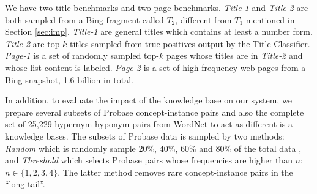 We have two title benchmarks and two page benchmarks.
\emph{Title-1} and \emph{Title-2} are both sampled from a
Bing fragment called $T_2$, different from $T_1$ mentioned in
Section \ref{sec:imp}. {\em Title-1} are general titles which contains
at least a number form.
{\em Title-2} are top-$k$ titles sampled from true positives output by the
Title Classifier.
\emph{Page-1} is a set of randomly sampled top-$k$ pages whose titles are in
{\em Title-2} and whose list content is labeled.
\emph{Page-2} is
a set of high-frequency web pages from a Bing snapshot,
1.6 billion in total.
%
%

%

%

In addition, to evaluate the impact of the knowledge base on our system,
we prepare several subsets of Probase concept-instance pairs and
also the complete set of 25,229 hypernym-hyponym pairs from
WordNet \cite{wordnet} to act as different is-a knowledge bases.
The subsets of Probase data is sampled by two methods:
{\em Random} which is randomly sample 20\%, 40\%, 60\% and 80\% of the total
data , and {\em Threshold} which selects
Probase pairs whose frequencies are higher than $n$: $n \in \{ 1, 2, 3, 4 \}$.
The latter method removes rare concept-instance pairs in the ``long tail''.

